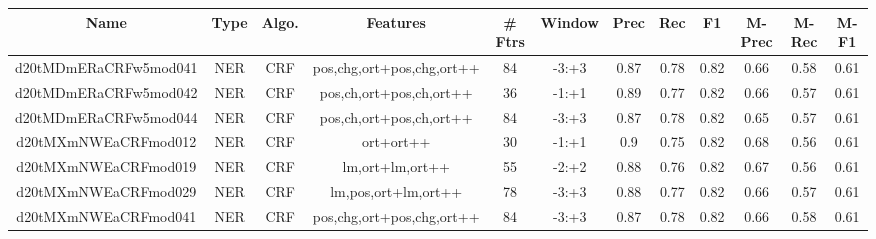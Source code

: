 \documentclass[a4paper]{article}
\begin{document}
\begin{landscape}
\begin{center}
\begin{tabular}{ |c|c|c|c|c|c|c|c|c|c|c|c|}
 \hline
\end{tabular}
\end{center}




\begin{center}
\begin{tabular}{ |c|c|c|c|c|c|c|c|c|c|c|c|} 
 \hline
 	Name & Type & Algo. & Features & \# Ftrs & Window & Prec & Rec & F1 & M-Prec & M-Rec & M-F1\\
 \hline

 		

 	
 
 	
 		
 		\small{ d20tMDmERaCRFw5mod041 } & NER & CRF & pos,chg,ort+pos,chg,ort++  &  84 &  -3:+3  &  0.87 & 0.78 & 0.82  &  0.66 & 0.58 & 0.61 \\
 		

 	
 
 	
 		
 		\small{ d20tMDmERaCRFw5mod042 } & NER & CRF & pos,ch,ort+pos,ch,ort++  &  36 &  -1:+1  &  0.89 & 0.77 & 0.82  &  0.66 & 0.57 & 0.61 \\
 		

 	
 
 	
 		
 		\small{ d20tMDmERaCRFw5mod044 } & NER & CRF & pos,ch,ort+pos,ch,ort++  &  84 &  -3:+3  &  0.87 & 0.78 & 0.82  &  0.65 & 0.57 & 0.61 \\
 		

 	
 
 	
 		
 		\small{ d20tMXmNWEaCRFmod012 } & NER & CRF & ort+ort++  &  30 &  -1:+1  &  0.9 & 0.75 & 0.82  &  0.68 & 0.56 & 0.61 \\
 		

 	
 
 	
 		
 		\small{ d20tMXmNWEaCRFmod019 } & NER & CRF & lm,ort+lm,ort++  &  55 &  -2:+2  &  0.88 & 0.76 & 0.82  &  0.67 & 0.56 & 0.61 \\
 		

 	
 
 	
 		
 		\small{ d20tMXmNWEaCRFmod029 } & NER & CRF & lm,pos,ort+lm,ort++  &  78 &  -3:+3  &  0.88 & 0.77 & 0.82  &  0.66 & 0.57 & 0.61 \\
 		

 	
 
 	
 		
 		\small{ d20tMXmNWEaCRFmod041 } & NER & CRF & pos,chg,ort+pos,chg,ort++  &  84 &  -3:+3  &  0.87 & 0.78 & 0.82  &  0.66 & 0.58 & 0.61 \\
 		


\end{tabular}
\end{center}
\end{landscape}
\end{document}
